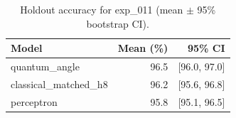 \begin{table}[ht]
\centering
\caption{Holdout accuracy for exp_011 (mean $\pm$ 95\% bootstrap CI).}
\label{tab:exp_011}
\begin{tabular}{lrr}
\toprule
Model & Mean (\%) & 95\% CI \\
\midrule
quantum\_angle & 96.5 & [96.0, 97.0] \\
classical\_matched\_h8 & 96.2 & [95.6, 96.8] \\
perceptron & 95.8 & [95.1, 96.5] \\
\bottomrule
\end{tabular}
\end{table}
